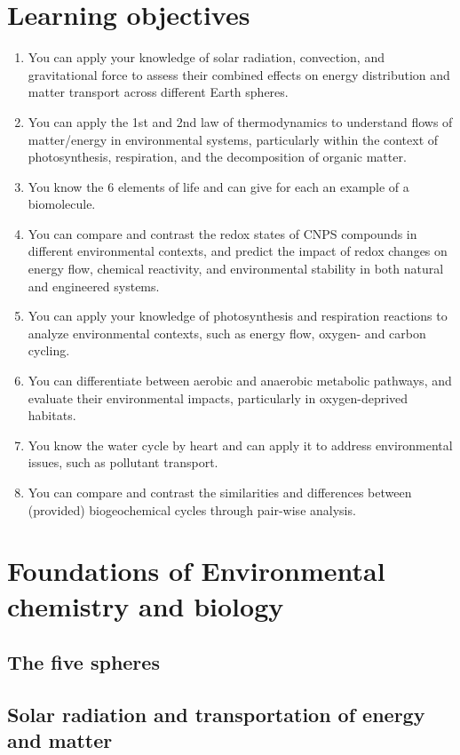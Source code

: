 \documentclass{article}
\begin{document}
\section{Learning objectives}
\begin{enumerate}
    \item You can apply your knowledge of solar radiation, convection, and gravitational force to assess their combined
    effects on energy distribution and matter transport across different Earth spheres.
    \item You can apply the 1st and 2nd law of thermodynamics to understand flows of matter/energy in environmental
    systems, particularly within the context of photosynthesis, respiration, and the decomposition of organic matter.
    \item You know the 6 elements of life and can give for each an example of a biomolecule.
    \item You can compare and contrast the redox states of CNPS compounds in different environmental contexts, and
    predict the impact of redox changes on energy flow, chemical reactivity, and environmental stability in both
    natural and engineered systems.
    \item You can apply your knowledge of photosynthesis and respiration reactions to analyze environmental contexts,
    such as energy flow, oxygen- and carbon cycling.
    \item You can differentiate between aerobic and anaerobic metabolic pathways, and evaluate their environmental
    impacts, particularly in oxygen-deprived habitats.
    \item You know the water cycle by heart and can apply it to address environmental issues, such as pollutant transport.
    \item You can compare and contrast the similarities and differences between (provided) biogeochemical cycles through
    pair-wise analysis.       
\end{enumerate}

\newpage
\section{Foundations of Environmental chemistry and biology}
\subsection{The five spheres}



\subsection{Solar radiation and transportation of energy and matter}
\end{document}
